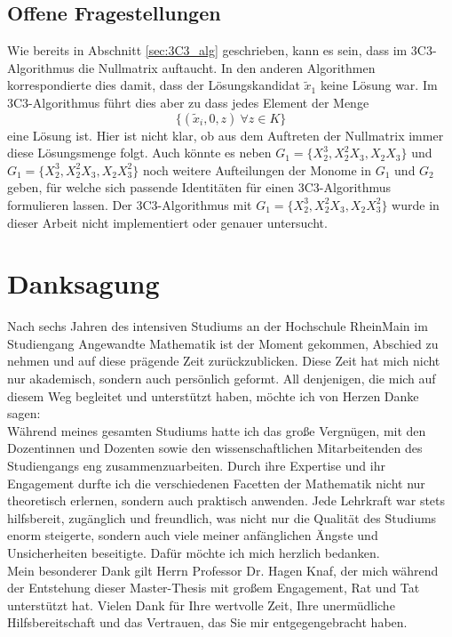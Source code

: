 \documentclass[a4paper,oneside, 11pt, openany%
]{article}
\theoremstyle{custom}
\theoremstyle{custom}
\begin{document}
	\subsection*{Offene Fragestellungen}
	Wie bereits in Abschnitt \ref{sec:3C3_alg} geschrieben, kann es sein, dass im 3C3-Algorithmus die Nullmatrix auftaucht. In den anderen Algorithmen korrespondierte dies damit, dass der Lösungskandidat $\tilde{x}_1$ keine Lösung war. Im 3C3-Algorithmus führt dies aber zu dass jedes Element der Menge \begin{equation*}
		\{(\tilde{x}_i,0,z) \ \forall z \in K\}
	\end{equation*}
	eine Lösung ist. Hier ist nicht klar, ob aus dem Auftreten der Nullmatrix immer diese Lösungsmenge folgt.
	Auch könnte es neben $G_1=\{X_2^3,X_2^2X_3,X_2X_3\}$ und $G_1=\{X_2^3,X_2^2X_3,X_2X_3^2\}$ noch weitere Aufteilungen der Monome in $G_1$ und $G_2$ geben, für welche sich passende Identitäten für einen 3C3-Algorithmus formulieren lassen.
	Der 3C3-Algorithmus mit  $G_1=\{X_2^3,X_2^2X_3,X_2X_3^2\}$ wurde in dieser Arbeit nicht implementiert oder genauer untersucht.
	\newpage
	\pagestyle{plain}

	\nocite{*}
	
			\newpage
	\section*{Danksagung}
	Nach sechs Jahren des intensiven Studiums an der Hochschule RheinMain im Studiengang Angewandte Mathematik ist der Moment gekommen, Abschied zu nehmen und auf diese prägende Zeit zurückzublicken. Diese Zeit hat mich nicht nur akademisch, sondern auch persönlich geformt. All denjenigen, die mich auf diesem Weg begleitet und unterstützt haben, möchte ich von Herzen Danke sagen:\\
	
	Während meines gesamten Studiums hatte ich das große Vergnügen, mit den Dozentinnen und Dozenten sowie den wissenschaftlichen Mitarbeitenden des Studiengangs eng zusammenzuarbeiten. Durch ihre Expertise und ihr Engagement durfte ich die verschiedenen Facetten der Mathematik nicht nur theoretisch erlernen, sondern auch praktisch anwenden. Jede Lehrkraft war stets hilfsbereit, zugänglich und freundlich, was nicht nur die Qualität des Studiums enorm steigerte, sondern auch viele meiner anfänglichen Ängste und Unsicherheiten beseitigte. Dafür möchte ich mich herzlich bedanken.\\
	
	Mein besonderer Dank gilt Herrn Professor Dr. Hagen Knaf, der mich während der Entstehung dieser Master-Thesis mit großem Engagement, Rat und Tat unterstützt hat. Vielen Dank für Ihre wertvolle Zeit, Ihre unermüdliche Hilfsbereitschaft und das Vertrauen, das Sie mir entgegengebracht haben.\\
	
\end{document}
